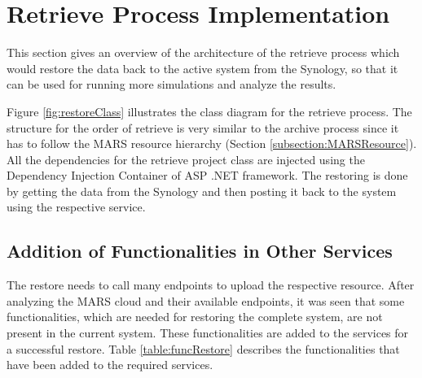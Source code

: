 \section{Retrieve Process Implementation}
This section gives an overview of the architecture of the retrieve process which would restore the data back to the active
system from the Synology, so that it can be used for running more simulations and analyze the results. 

Figure \ref{fig:restoreClass} illustrates the class diagram for the retrieve process. The structure for the order of retrieve is very similar to the archive process
since it has to follow the MARS resource hierarchy (Section \ref{subsection:MARSResource}). All the dependencies for the retrieve project class are injected
using the Dependency Injection Container of ASP .NET framework. The restoring is done by getting the data from the Synology and then posting it back to the system
using the respective service.

\subsection{Addition of Functionalities in Other Services}
The restore needs to call many endpoints to upload the respective resource. After analyzing the MARS cloud and their available endpoints, it was
seen that some functionalities, which are needed for restoring the complete system, are not present in the current system. These functionalities are
added to the services for a successful restore. Table \ref{table:funcRestore} describes the functionalities that have been
added to the required services.

